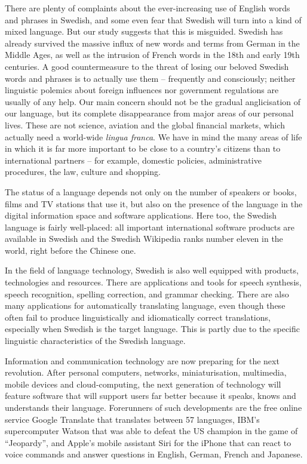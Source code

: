 \begin{multicols}{2}
There are plenty of complaints about the ever-increasing use of
English words and phrases in Swedish, and some even fear that Swedish
will turn into a kind of mixed language. But our study \mbox{suggests} that
this is misguided. Swedish has already survived the massive influx of
new words and terms from German in the Middle Ages, as well as the
intrusion of French words in the 18th and early 19th centuries. A good
countermeasure to the threat of losing our beloved Swedish words and
phrases is to actually use them -- frequently and consciously; \mbox{neither}
linguistic polemics about foreign influences nor government
regulations are usually of any help. Our main concern should not be
the gradual angli\-cisation of our language, but its complete
disappearance from major areas of our personal lives. These are not
science, aviation and the global financial markets, which actually
need a world-wide \emph{lingua franca}. We have in mind the many areas of
life in which it is far more important to be close to a country’s
citizens than to international partners -- for example, domestic
policies, administrative procedures, the law, culture and shopping.

The status of a language depends not only on the number of speakers or
books, films and TV \mbox{stations} that use it, but also on the presence of
the lang\-uage in the digital information space and software
applications. Here too, the Swedish language is fairly well-placed:
all important international software products are available in Swedish
and the Swedish Wikipedia ranks number eleven in the world,
right before the Chinese one.
 
In the field of language technology, Swedish is also well equipped
with products, technologies and \mbox{resources}. There are applications and
tools for speech synthesis, speech recognition, spelling \mbox{correction},
and grammar checking. There are also many applications for
automatically translating lang\-uage, even though these often fail to
produce linguistically and idiomatically correct translations,
especially when Swedish is the target lang\-uage. This is partly due to
the specific linguistic characteristics of the Swedish language.

Information and communication technology are now preparing for the
next revolution. \mbox{After} \mbox{personal} computers, net\-works, miniatur\-isation,
multi\-media, mobile devices and cloud-computing, the next generation of
technology will feature software that will support users far better
because it speaks, knows and understands their language. Forerunners
of such developments are the free online service Google Translate that
translates between 57 languages, IBM’s supercomputer Watson that was
able to defeat the US champion in the game of “Jeopardy”, and Apple’s
mobile assistant Siri for the iPhone that can react to voice commands
and answer questions in English, German, French and Japanese.


\end{multicols}
